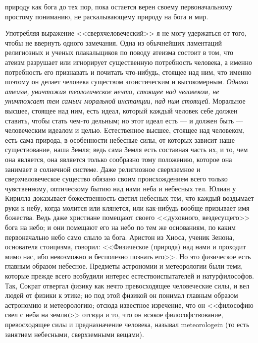 \documentclass[12pt]{article}
\begin{document}
природу как бога до тех пор, пока остается верен своему первоначальному простому пониманию, не раскалывающему природу на бога и мир. 

Употребляя выражение <<сверхчеловеческий>>  я не могу удержаться от того, чтобы не ввернуть одного замечания. Одна из обычнейших ламентаций религиозных и ученых плакальщиков по поводу атеизма состоит в том, что атеизм разрушает или игнорирует существенную потребность человека, а именно потребность его признавать и почитать что-нибудь, стоящее над ним, что именно поэтому он делает человека существом эгоистическим и высокомерным. \emph{Однако атеизм, уничтожая теологическое нечто, стоящее над человеком, не уничтожает тем самым моральной инстанции, над ним стоящей}. Моральное высшее, стоящее над ним, есть идеал, который каждый человек себе должен ставить, чтобы стать чем-то дельным; но этот идеал есть --- и должен быть --- человеческим идеалом и целью. Естественное высшее, стоящее над человеком, есть сама природа, в особенности небесные силы, от которых зависит наше существование, наша Земля; ведь сама Земля есть составная часть их, и то, чем она является, она является только сообразно тому положению, которое она занимает в солнечной системе. Даже религиозное сверхземное и сверхчеловеческое существо обязано своим происхождением всего только чувственному, оптическому бытию над нами неба и небесных тел. Юлиан у Кирилла доказывает божественность светил небесных тем, что каждый воздымает руки к небу, когда молится или клянется, или как-нибудь вообще призывает имя божества. Ведь даже христиане помещают своего <<духовного, вездесущего>> бога на небо; и они помещают его на небо по тем же основаниям, по каким первоначально небо само слыло за бога. Аристон из Хиоса, ученик Зенона, основателя стоицизма, говорил: <<Физическое (природа) над нами и проходит мимо нас, ибо невозможно и бесполезно познать его>>. Но это физическое есть главным образом небесное. Предметы астрономии и метеорологии были теми, которые прежде всего возбудили интерес естествоиспытателей и натурфилософов. Так, Сократ отвергал физику как нечто превосходящее человеческие силы, и вел людей от физики к этике; но под этой физикой он понимал главным образом астрономию и метеорологию; отсюда известное изречение, что он <<философию свел с неба на землю>>  отсюда и то, что он всякое философствование, превосходящее силы и предназначение человека, называл meteorologein (то есть занятием небесными, сверхземными вещами). 
\end{document}
